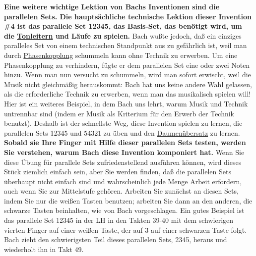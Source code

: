 \textbf{Eine weitere wichtige Lektion von Bachs Inventionen sind die parallelen Sets.
Die hauptsächliche technische Lektion dieser Invention \#4 ist das parallele Set 12345, das Basis-Set, das benötigt wird, um die \hyperref[c1iii5]{Tonleitern} und Läufe zu spielen.}
Bach wußte jedoch, daß ein einziges paralleles Set von einem technischen Standpunkt aus zu gefährlich ist, weil man durch \hyperref[c1iii7b2]{Phasenkopplung} schummeln kann ohne Technik zu erwerben.
Um eine Phasenkopplung zu verhindern, fügte er dem parallelen Set eine oder zwei Noten hinzu.
Wenn man nun versucht zu schummeln, wird man sofort erwischt, weil die Musik nicht gleichmäßig herauskommt: Bach hat uns keine andere Wahl gelassen, als die erforderliche Technik zu erwerben, wenn man das musikalisch spielen will!
Hier ist ein weiteres Beispiel, in dem Bach uns lehrt, warum Musik und Technik untrennbar sind (indem er Musik als Kriterium für den Erwerb der Technik benutzt).
Deshalb ist der schnellste Weg, diese Invention spielen zu lernen, die parallelen Sets 12345 und 54321 zu üben und den \hyperref[c1iii5b]{Daumenübersatz} zu lernen.
\textbf{Sobald sie Ihre Finger mit Hilfe dieser parallelen Sets testen, werden Sie verstehen, warum Bach diese Invention komponiert hat.}
Wenn Sie diese Übung für parallele Sets zufriedenstellend ausführen können, wird dieses Stück ziemlich einfach sein, aber Sie werden finden, daß die parallelen Sets überhaupt nicht einfach sind und wahrscheinlich jede Menge Arbeit erfordern, auch wenn Sie zur Mittelstufe gehören.
Arbeiten Sie zunächst an diesen Sets, indem Sie nur die weißen Tasten benutzen; arbeiten Sie dann an den anderen, die schwarze Tasten beinhalten, wie von Bach vorgeschlagen.
Ein gutes Beispiel ist das parallele Set 12345 in der LH in den Takten 39-40 mit dem schwierigen vierten Finger auf einer weißen Taste, der auf 3 auf einer schwarzen Taste folgt.
Bach zieht den schwierigsten Teil dieses parallelen Sets, 2345, heraus und wiederholt ihn in Takt 49.

